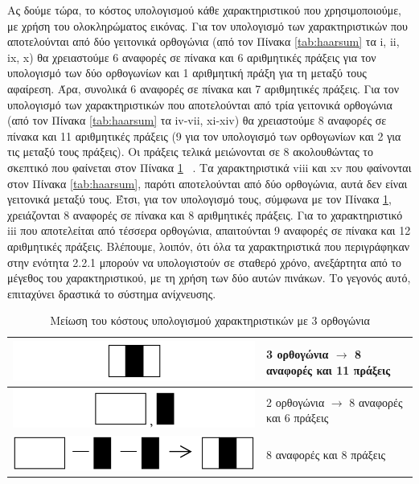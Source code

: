 Ας δούμε τώρα, το κόστος υπολογισμού κάθε χαρακτηριστικού που χρησιμοποιούμε, με
χρήση του ολοκληρώματος εικόνας. Για τον υπολογισμό των χαρακτηριστικών που αποτελούνται από
δύο γειτονικά ορθογώνια (από τον Πίνακα \ref{tab:haarsum} τα i, ii, ix, x) θα χρειαστούμε 6 αναφορές σε πίνακα
και 6 αριθμητικές πράξεις για τον υπολογισμό των δύο ορθογωνίων και 1 αριθμητική πράξη για τη
μεταξύ τους αφαίρεση. Άρα, συνολικά 6 αναφορές σε πίνακα και 7 αριθμητικές πράξεις. Για τον
υπολογισμό των χαρακτηριστικών που αποτελούνται από τρία γειτονικά ορθογώνια (από  τον Πίνακα
\ref{tab:haarsum} τα iv-vii, xi-xiv) θα χρειαστούμε 8 αναφορές σε πίνακα και 11 αριθμητικές πράξεις (9 για τον
υπολογισμό των ορθογωνίων και 2 για τις μεταξύ τους πράξεις). Οι πράξεις τελικά μειώνονται σε 8
ακολουθώντας το σκεπτικό που φαίνεται στον Πίνακα \ref{tab:opthaar} ~\cite{Lienhart02anextended}. Τα χαρακτηριστικά viii και xv
που φαίνονται στον Πίνακα \ref{tab:haarsum}, παρότι αποτελούνται από δύο ορθογώνια, αυτά δεν είναι γειτονικά
μεταξύ τους. Έτσι, για τον υπολογισμό τους, σύμφωνα με τον Πίνακα \ref{tab:opthaar}, χρειάζονται 8 αναφορές
σε πίνακα και 8 αριθμητικές πράξεις. Για το χαρακτηριστικό iii που αποτελείται από τέσσερα
ορθογώνια, απαιτούνται 9 αναφορές σε πίνακα και 12 αριθμητικές πράξεις. Βλέπουμε, λοιπόν, ότι
όλα τα χαρακτηριστικά που περιγράφηκαν στην ενότητα 2.2.1 μπορούν να υπολογιστούν σε σταθερό
χρόνο, ανεξάρτητα από το μέγεθος του χαρακτηριστικού, με τη χρήση των δύο αυτών πινάκων. Το
γεγονός αυτό, επιταχύνει δραστικά το σύστημα ανίχνευσης.


\begin{table}[htbp]
  \centering
    \begin{tabular}{ | l | l | }
    \hline
        \includegraphics[width=0.4\maxwidth]{../figures/im1.png}
        & 3 ορθογώνια $\rightarrow$ 8 αναφορές και 11 πράξεις \\
    \hline
        \includegraphics[width=0.4\maxwidth]{../figures/im2.png}
        & 2 ορθογώνια $\rightarrow$ 8 αναφορές και 6 πράξεις \\
    \hline
        \includegraphics[width=0.4\maxwidth]{../figures/im3.png}
        &  8 αναφορές και 8 πράξεις \\
    \hline
  \end{tabular}
  \caption{Μείωση του κόστους υπολογισμού χαρακτηριστικών με 3 ορθογώνια}
  \label{tab:opthaar}
\end{table}


